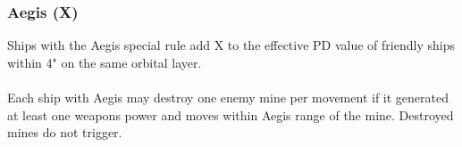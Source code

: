 \subsubsection{Aegis (X)}
Ships with the Aegis special rule add X to the effective PD value of friendly ships within 4" on the same orbital layer.
\\\\
Each ship with Aegis may destroy one enemy mine per movement if it generated at least one weapons power and moves within Aegis range of the mine. Destroyed mines do not trigger.
